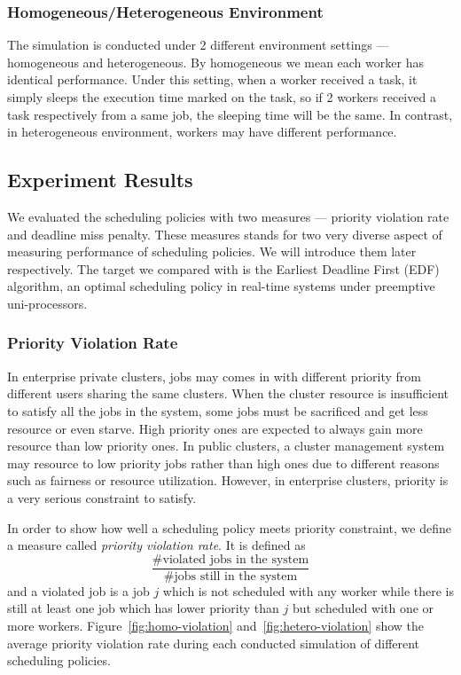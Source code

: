 \subsubsection{Homogeneous/Heterogeneous Environment}

The simulation is conducted under 2 different environment settings ---
homogeneous and heterogeneous.
By homogeneous we mean each worker has identical performance.
Under this setting, when a worker received a task, it simply sleeps the
execution time marked on the task, so if 2 workers received a task
respectively from a same job, the sleeping time will be the same.
In contrast, in heterogeneous environment, workers may have different
performance.

\subsection{Experiment Results}

We evaluated the scheduling policies with two measures --- priority
violation rate and deadline miss penalty.
These measures stands for two very diverse aspect of measuring
performance of scheduling policies.
We will introduce them later respectively.
The target we compared with is the Earliest Deadline
First (EDF) algorithm, an optimal scheduling policy in real-time systems
under preemptive uni-processors.

\subsubsection{Priority Violation Rate}

In enterprise private clusters, jobs may comes in with different
priority from different users sharing the same clusters.
When the cluster resource is insufficient to satisfy all the jobs in the
system, some jobs must be sacrificed and get less resource or even
starve.
High priority ones are expected to always gain more resource than low
priority ones.
In public clusters, a cluster management system may resource to low
priority jobs rather than high ones due to different reasons such as fairness or resource utilization.
However, in enterprise clusters, priority is a very serious constraint
to satisfy.

In order to show how well a scheduling policy meets priority constraint,
we define a measure called \emph{priority violation rate}.
It is defined as $$\frac{\textrm{\#violated jobs in the
system}}{\textrm{\#jobs still in the system}}$$ and a violated job is a
job $j$ which is not scheduled with any worker while there is still at
least one job which has lower priority than $j$ but scheduled with one
or more workers.
Figure~\ref{fig:homo-violation} and~\ref{fig:hetero-violation} show the
average priority violation rate during each conducted simulation of
different scheduling policies.

